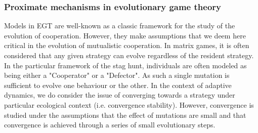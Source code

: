 
        \subsubsection{Proximate mechanisms in evolutionary game theory}

            Models in EGT are well-known as a classic framework for the study of the evolution of cooperation. However, they make assumptions that we deem here critical in the evolution of mutualistic cooperation. In matrix games, it is often considered that any given strategy can evolve regardless of the resident strategy. In the particular framework of the stag hunt, individuals are often modeled as being either a "Cooperator" or a "Defector". As such a single mutation is sufficient to evolve one behaviour or the other. In the context of adaptive dynamics, we do consider the issue of converging towards a strategy under particular ecological context (i.e. convergence stability). However, convergence is studied under the assumptions that the effect of mutations are small and that convergence is achieved through a series of small evolutionary steps.

